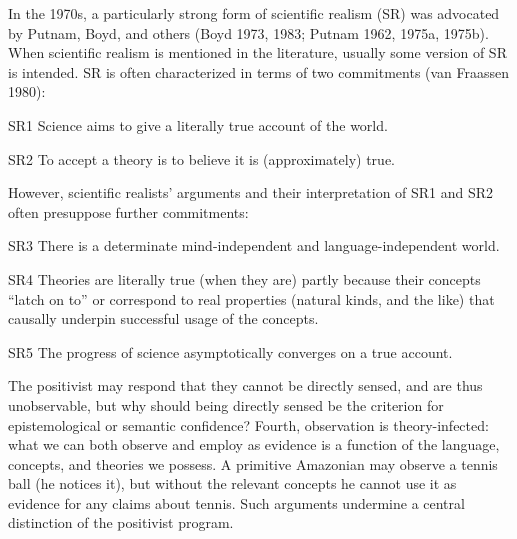 In the 1970s, a particularly strong form of scientific realism (SR) was
advocated by Putnam, Boyd, and others (Boyd 1973, 1983; Putnam 1962, 1975a,
1975b). When scientific realism is mentioned in the literature, usually some
version of SR is intended. SR is often characterized in terms of two commitments
(van Fraassen 1980):

SR1     Science aims to give a literally true account of the world.

SR2     To accept a theory is to believe it is (approximately) true.

However, scientific realists’ arguments and their interpretation of SR1 and SR2
often presuppose further commitments:

SR3     There is a determinate mind-independent and language-independent world.

SR4     Theories are literally true (when they are) partly because their
concepts “latch on to” or correspond to real properties (natural kinds, and the
like) that causally underpin successful usage of the concepts.

SR5     The progress of science asymptotically converges on a true account.



The positivist may respond that they cannot be directly sensed, and are thus
unobservable, but why should being directly sensed be the criterion for
epistemological or semantic confidence? Fourth, observation is theory-infected:
what we can both observe and employ as evidence is a function of the language,
concepts, and theories we possess. A primitive Amazonian may observe a tennis
ball (he notices it), but without the relevant concepts he cannot use it as
evidence for any claims about tennis. Such arguments undermine a central
distinction of the positivist program.

